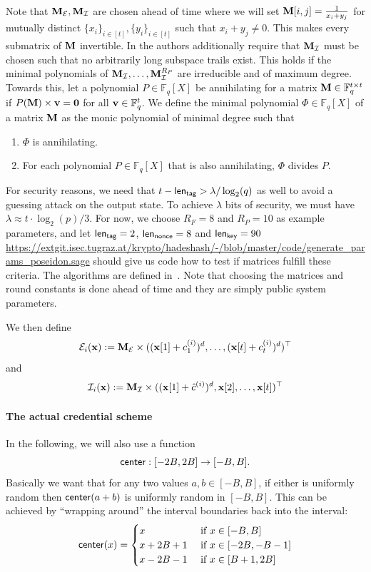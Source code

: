 Note that $\mathbf{M}_{\mathcal{E}},\mathbf{M}_{\mathcal{I}}$ are chosen ahead of time where we will set $\mathbf{M}[i,j]=\frac{1}{x_i+y_j}$  for mutually distinct $\{x_i\}_{i\in [t]},\{y_i\}_{i\in [t]}$ such that $x_i+y_j\neq 0$. This makes every submatrix of $\mathbf{M}$ invertible. In \cite{AFRICACRYPT:GraKhoSch23} the authors additionally require that $\mathbf{M}_{\mathcal{I}}$ must be chosen such that no arbitrarily long subspace trails exist. This holds if the minimal polynomials of $\mathbf{M}_{\mathcal{I}},\dots,\mathbf{M}_{\mathcal{I}}^{R_P}$ are irreducible and of maximum degree. Towards this, let a polynomial $P\in \mathbb{F}_q[X]$ be annihilating for a matrix $\mathbf{M}\in \mathbb{F}_q^{t\times t}$ if $P(\mathbf{M})\times \mathbf{v}=\mathbf{0}$ for all $\mathbf{v}\in \mathbb{F}_q^t$.
We define the minimal polynomial $\Phi\in \mathbb{F}_q[X]$ of a matrix $\mathbf{M}$ as the monic polynomial of minimal degree such that
\begin{enumerate}
    \item $\Phi$ is annihilating.
    \item For each polynomial $P\in \mathbb{F}_q[X]$ that is also annihilating, $\Phi$ divides $P$.
\end{enumerate}
For security reasons, we need that $t-\mathsf{len}_{\mathsf{tag}} > \lambda/\log_2(q)$ as well to avoid a guessing attack on the output state. To achieve $\lambda$ bits of security, we must have $\lambda\approx  t\cdot \log_2(p)/3$. For now, we choose $R_F=8$ and $R_P=10$ as example parameters, and let $\mathsf{len}_{\mathsf{tag}}=2$, $\mathsf{len}_{\mathsf{nonce}}=8$ and $\mathsf{len}_{\mathsf{key}}=90$ \url{https://extgit.isec.tugraz.at/krypto/hadeshash/-/blob/master/code/generate_params_poseidon.sage} should give us code how to test if matrices fulfill these criteria. The algorithms are defined in~\cite{ToSC:GraRecSch21}. Note that choosing the matrices and round constants is done ahead of time and they are simply public system parameters.



We then define $$\mathcal{E}_{i}(\mathbf{x}):=\mathbf{M}_\mathcal{E}\times((\mathbf{x}[1]+c_1^{(i)})^d,\dots,(\mathbf{x}[t]+c_t^{(i)})^d)^\top
$$
and
$$\mathcal{I}_{i}(\mathbf{x}):=\mathbf{M}_\mathcal{I}\times((\mathbf{x}[1]+\hat{c}^{(i)})^d,\mathbf{x}[2],\dots,\mathbf{x}[t])^\top
$$


\paragraph{The actual credential scheme}
In the following, we will also use a function 
$$\mathsf{center}: [-2B,2B] \rightarrow [-B,B] \text{.}$$ Basically we want that for any two values $a,b\in [-B,B]$, if either is uniformly random then $\mathsf{center}(a+b)$ is uniformly random in $[-B,B]$. 
This can be achieved by ``wrapping around'' the interval boundaries back into the interval:
$$
\mathsf{center}(x)=\begin{cases}
    x & \text{ if } x\in [-B,B]\\
   x+2B+1 & \text { if } x\in [-2B,-B-1] \\
x-2B-1 & \text { if } x\in [B+1,2B] 
\end{cases}
$$

